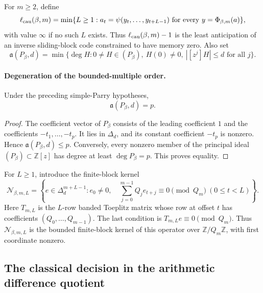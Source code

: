 For $m\ge2$, define
\begin{equation}
\ell_{\rm cau}(\beta,m)
=\min\{L\ge1:a_t=\psi(y_t,\ldots,y_{t+L-1})
\text{ for every }y=\Phi_{\beta,m}(a)\},
\label{eq:simple-parry-causal-length}
\end{equation}
with value $\infty$ if no such $L$ exists.  Thus
$\ell_{\rm cau}(\beta,m)-1$ is the least anticipation of an inverse
sliding-block code constrained to have memory zero.  Also set
\[
\mathfrak a(P_\beta,d)
=\min\{\deg H:0\ne H\in(P_\beta),\ H(0)\ne0,
\ |[z^j]H|\le d\text{ for all }j\}.
\]

\paragraph{Degeneration of the bounded-multiple order.}
\label{prop:simple-parry-bounded-order}
Under the preceding simple-Parry hypotheses,
\[
\mathfrak a(P_\beta,d)=p.
\]

\begin{proof}
The coefficient vector of $P_\beta$ consists of the leading coefficient
$1$ and the coefficients $-t_1,\ldots,-t_p$.  It lies in $\Delta_d$, and its
constant coefficient $-t_p$ is nonzero.  Hence
$\mathfrak a(P_\beta,d)\le p$.  Conversely, every nonzero member of the
principal ideal $(P_\beta)\subset\mathbb Z[z]$ has degree at least
$\deg P_\beta=p$.  This proves equality.
\end{proof}

For $L\ge1$, introduce the finite-block kernel
\begin{equation}
\mathcal N_{\beta,m,L}
=\left\{e\in\Delta_d^{m+L-1}:
e_0\ne0,\quad
\sum_{j=0}^{m-1}Q_je_{t+j}\equiv0\pmod{Q_m}
\ (0\le t<L)\right\}.
\label{eq:bad-sliding-congruence-set}
\end{equation}
Here $T_{m,L}$ is the $L$-row banded Toeplitz matrix whose row at offset $t$
has coefficients $(Q_0,\ldots,Q_{m-1})$.  The last condition is
$T_{m,L}e\equiv0\pmod{Q_m}$.  Thus $\mathcal N_{\beta,m,L}$ is the bounded
finite-block kernel of this operator over $\mathbb Z/Q_m\mathbb Z$, with
first coordinate nonzero.

\subsection{The classical decision in the arithmetic difference quotient}


